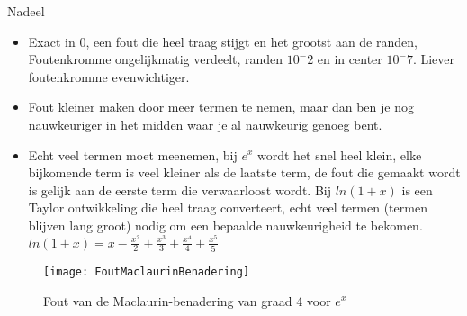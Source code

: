 \begin{exam}
\begin{description}
		      Nadeel
		      \begin{itemize}
			      \item  Exact in 0, een fout die heel traag stijgt en het grootst aan de randen, Foutenkromme ongelijkmatig verdeelt, randen $10^-2$ en in center $10^-7$. Liever foutenkromme evenwichtiger.
			      \item Fout kleiner maken door meer termen te nemen, maar dan ben je nog nauwkeuriger in het midden waar je al nauwkeurig genoeg bent.
			      \item Echt veel termen moet meenemen, bij $e^x$ wordt het snel heel klein, elke bijkomende term is veel kleiner als de laatste term, de fout die gemaakt wordt is gelijk aan de eerste term die verwaarloost wordt. Bij $ln(1+x)$ is een Taylor ontwikkeling die heel traag converteert, echt veel termen (termen blijven lang groot) nodig om een bepaalde nauwkeurigheid te bekomen. $ln(1+x) = x - \frac{x^2}{2}+ \frac{x^3}{3}+ \frac{x^4}{4}+ \frac{x^5}{5}$
		      \end{itemize}
		      \begin{figure}[!h]
			      \centering
			      \texttt{[image: FoutMaclaurinBenadering]}
			      \caption{Fout van de Maclaurin-benadering van graad 4 voor $e^x$}
		      \end{figure}


\end{description}
\end{exam}
